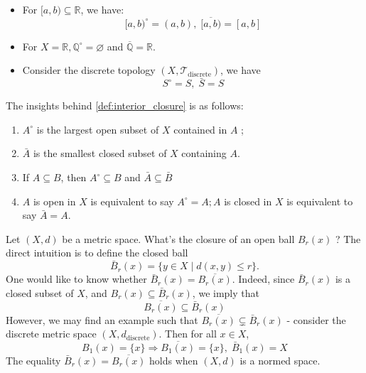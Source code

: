 \begin{example}
\begin{example}
\begin{itemize}
\item For \(\lbrack a,b) \subseteq  \mathbb{R}\), we have:
\[
\lbrack a,b{)}^{ \circ } = \left({a,b}\right),\;\overline{\lbrack a,b)} = \left\lbrack  {a,b}\right\rbrack
\]

\item For \(X = \mathbb{R},{\mathbb{Q}}^{ \circ } = \varnothing\) and \(\overline{\mathbb{Q}} = \mathbb{R}\).

\item Consider the discrete topology \(\left({X,{\mathcal{T}}_{\text{discrete}}}\right)\), we have
\[
{S}^{ \circ } = S,\;\bar{S} = S
\]
\end{itemize}
\end{example}

The insights behind \autoref{def:interior_closure} is as follows:
\begin{proposition} \begin{enumerate}
    \item  \({A}^{ \circ }\) is the largest open subset of \(X\) contained in \(A\) ;

\item \(\bar{A}\) is the smallest closed subset of \(X\) containing \(A\).

\item If \(A \subseteq  B\), then \({A}^{ \circ } \subseteq  B\) and \(\bar{A} \subseteq  \bar{B}\)

\item \(A\) is open in \(X\) is equivalent to say \({A}^{ \circ } = A;A\) is closed in \(X\) is equivalent to say \(\bar{A} = A\).
\end{enumerate}
\end{proposition}

\begin{example} Let $(X, d)$ be a metric space. What’s the closure of an open ball \({B}_{r}\left(x\right)\) ? The direct intuition is to define the closed ball
\[
{\bar{B}}_{r}\left(x\right)  = \{ y \in  X \mid  d\left({x,y}\right)  \leq  r\}.
\]
One would like to know whether \({\bar{B}}_{r}\left(x\right)  = \overline{{B}_{r}\left(x\right)}\). Indeed, since \({\bar{B}}_{r}\left(x\right)\) is a closed subset of \(X\), and \({B}_{r}\left(x\right)  \subseteq  {\bar{B}}_{r}\left(x\right)\), we imply that
\[
\overline{{B}_{r}\left(x\right)} \subseteq  {\bar{B}}_{r}\left(x\right)
\]
However, we may find an example such that \(\overline{{B}_{r}\left(x\right)}\subsetneq {\bar{B}}_{r}\left(x\right)\) - consider the discrete metric space \(\left({X, {d}_{\text{discrete}}}\right)\). Then for all \(x \in  X\),
\[
B_1\left(x\right)  = \{ x\}  \Rightarrow  \overline{B_1\left(x\right)} = \{ x\},\;{\bar{B}}_{1}\left(x\right)  = X
\]
The equality \({\bar{B}}_{r}\left(x\right)  = \overline{{B}_{r}\left(x\right)}\) holds when $(X, d)$ is a normed space.
\end{example}


\end{example}
